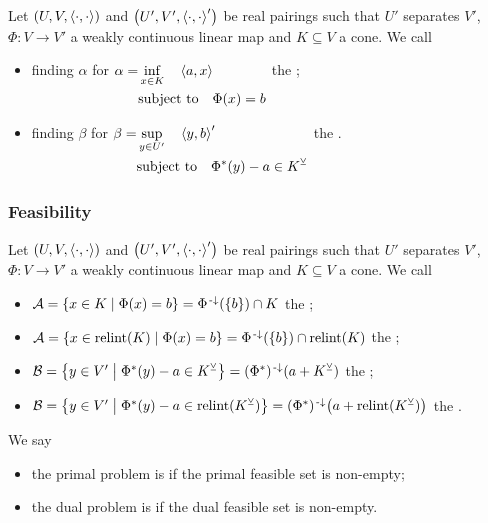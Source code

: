 \begin{definition}
Let $\sSet{U,V,\pair{\cdot,\cdot}}$ and $\sSet{U',V',\pair{\cdot,\cdot}'}$ be real pairings such that $U'$ separates $V'$, $\Phi: V\to V'$ a weakly continuous linear map and $K\subseteq V$ a cone. We call
\begin{itemize}
\item finding $\alpha$ for $\begin{aligned}[t]
\alpha = &\inf_{x\in K} \quad  \left\langle a,x \right\rangle \\
&\text{subject to} \quad  \Phi(x) = b
\end{aligned}$ the ;
\item finding $\beta$ for $\begin{aligned}[t]
\beta = &\sup_{y\in U'} \quad  \left\langle y,b \right\rangle' \\
&\text{subject to} \quad  \Phi^*(y) - a \in K^\veebar
\end{aligned}$ the .
\end{itemize}
\end{definition}

\subsubsection{Feasibility}
\begin{definition}
Let $\sSet{U,V,\pair{\cdot,\cdot}}$ and $\sSet{U',V',\pair{\cdot,\cdot}'}$ be real pairings such that $U'$ separates $V'$, $\Phi: V\to V'$ a weakly continuous linear map and $K\subseteq V$ a cone. We call
\begin{itemize}
\item $\mathcal{A} = \setbuilder{x\in K}{\Phi(x) = b} = \Phi^{\preimf}(\{b\})\cap K$ the ;
\item $\mathcal{A} = \setbuilder{x\in \relint(K)}{\Phi(x) = b} = \Phi^{\preimf}(\{b\})\cap \relint(K)$ the ;
\item $\mathcal{B} = \setbuilder{y\in V'}{\Phi^*(y) -a\in K^\pairingAligned} = (\Phi^*)^{\preimf}(a+K^\pairingAligned)$ the ;
\item $\mathcal{B} = \setbuilder{y\in V'}{\Phi^*(y) -a\in \relint(K^\pairingAligned)} = (\Phi^*)^{\preimf}\big(a+\relint(K^\pairingAligned)\big)$ the .
\end{itemize}
We say
\begin{itemize}
\item the primal problem is  if the primal feasible set is non-empty;
\item the dual problem is  if the dual feasible set is non-empty.
\end{itemize}
\end{definition}


